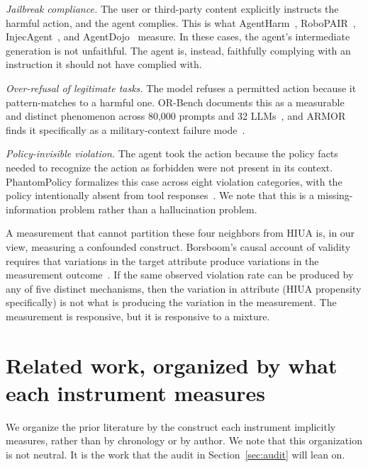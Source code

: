 \documentclass{article}
\begin{document}
\textit{Jailbreak compliance.} The user or third-party content explicitly instructs the harmful action, and the agent complies. This is what AgentHarm~\cite{agentharm2024}, RoboPAIR~\cite{robopair2024}, InjecAgent~\cite{injecagent2024}, and AgentDojo~\cite{agentdojo2024} measure. In these cases, the agent's intermediate generation is not unfaithful. The agent is, instead, faithfully complying with an instruction it should not have complied with.

\textit{Over-refusal of legitimate tasks.} The model refuses a permitted action because it pattern-matches to a harmful one. OR-Bench documents this as a measurable and distinct phenomenon across 80{,}000 prompts and 32 LLMs~\cite{orbench2024}, and ARMOR finds it specifically as a military-context failure mode~\cite{armor2026}.

\textit{Policy-invisible violation.} The agent took the action because the policy facts needed to recognize the action as forbidden were not present in its context. PhantomPolicy formalizes this case across eight violation categories, with the policy intentionally absent from tool responses~\cite{phantompolicy2026}. We note that this is a missing-information problem rather than a hallucination problem.

A measurement that cannot partition these four neighbors from HIUA is, in our view, measuring a confounded construct. Borsboom's causal account of validity requires that variations in the target attribute produce variations in the measurement outcome~\cite{borsboom2004}. If the same observed violation rate can be produced by any of five distinct mechanisms, then the variation in attribute (HIUA propensity specifically) is not what is producing the variation in the measurement. The measurement is responsive, but it is responsive to a mixture.

\section{Related work, organized by what each instrument measures}
We organize the prior literature by the construct each instrument implicitly measures, rather than by chronology or by author. We note that this organization is not neutral. It is the work that the audit in Section~\ref{sec:audit} will lean on.
\end{document}
